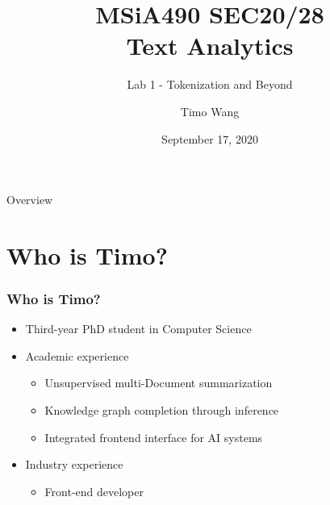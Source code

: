 \documentclass{beamer}
\begin{document}
\title{MSiA490 SEC20/28\\ Text Analytics}
\subtitle{Lab 1 - Tokenization and Beyond}
\author{Timo Wang}
\date{September 17, 2020}

\begin{frame}
    \titlepage
\end{frame}

\begin{frame}{Overview}
    \tableofcontents[hideallsubsections]
\end{frame}

\section{Who is Timo?}
\begin{frame}
    \frametitle{Who is Timo?}
    \begin{itemize}
        \item Third-year PhD student in Computer Science
        \item Academic experience
        \begin{itemize}
            \item Unsupervised multi-Document summarization
            \item Knowledge graph completion through inference
            \item Integrated frontend interface for AI systems
        \end{itemize}
        \item Industry experience
        \begin{itemize}
            \item Front-end developer
        \end{itemize}
    \end{itemize}
\end{frame}
\end{document}
